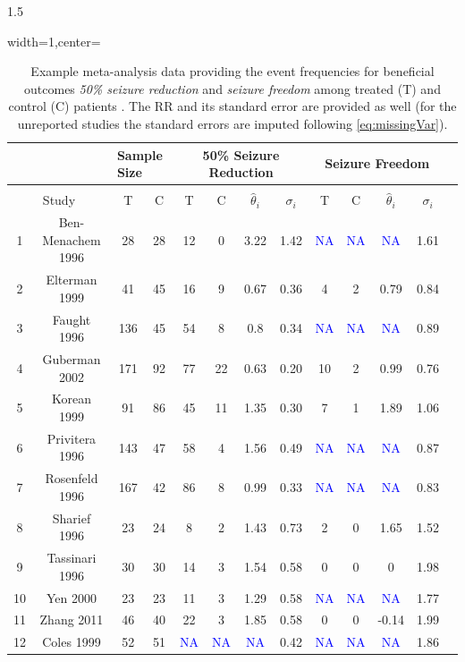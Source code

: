 \documentclass{article}
\begin{document}
\begin{spacing}{1.5}
\begin{table}[H]
\centering
\caption{Example meta-analysis data providing the event frequencies for beneficial outcomes \textit{50\% seizure reduction} and \textit{seizure freedom} among treated (T) and control (C) patients \cite{copas2019model, bresnahan2019topiramate}. The RR and its standard error are provided as well (for the unreported studies the standard errors are imputed following \eqref{eq:missingVar}).}
\label{tab:data}
\begin{adjustbox}{width=1\textwidth,center=\textwidth}
\begin{tabular}{ccccccccccccc}
\hline
\textbf{} &                   & \multicolumn{2}{l}{Sample Size} & \multicolumn{4}{c}{50\% Seizure Reduction}    & \multicolumn{4}{c}{Seizure Freedom}             \\ \hline \\[-0.4cm] 
\multicolumn{2}{c}{Study}     & T  & C   & T  & C  & $\hat\theta_i$  & $\sigma_i$ & T  & C   & $\hat\theta_i$   & $\sigma_i$ \\ \hline 
1  & Ben-Menachem 1996 & 28  & 28    & 12  & 0  & 3.22   & 1.42  & \textcolor{blue}{NA} & \textcolor{blue}{NA} & \textcolor{blue}{NA} & 1.61       \\2     & Elterman 1999   & 41   & 45  & 16  & 9  & 0.67  & 0.36    & 4   & 2  & 0.79  & 0.84       \\3  & Faught 1996 & 136 & 45  & 54   & 8   & 0.8    & 0.34 & \textcolor{blue}{NA} & \textcolor{blue}{NA} & \textcolor{blue}{NA} & 0.89 \\4  & Guberman 2002   & 171  & 92       & 77  & 22 & 0.63    & 0.20   & 10  & 2   & 0.99    & 0.76 \\5  & Korean 1999 & 91   & 86   & 45    & 11   & 1.35 & 0.30  & 7   & 1   & 1.89  & 1.06       \\6   & Privitera 1996    & 143 & 47  & 58    & 4  & 1.56  & 0.49   & \textcolor{blue}{NA} & \textcolor{blue}{NA} & \textcolor{blue}{NA}& 0.87       \\7  & Rosenfeld 1996 & 167 & 42 & 86  & 8  & 0.99   & 0.33  & \textcolor{blue}{NA} & \textcolor{blue}{NA} & \textcolor{blue}{NA} & 0.83 \\ 8   & Sharief 1996  & 23  & 24  & 8   & 2  & 1.43 & 0.73 & 2  & 0 & 1.65  & 1.52 \\9   & Tassinari 1996    & 30  & 30  & 14  & 3 & 1.54  & 0.58       & 0   & 0  & 0 & 1.98 \\10  & Yen 2000 & 23  & 23 & 11  & 3   & 1.29& 0.58  & \textcolor{blue}{NA} & \textcolor{blue}{NA} & \textcolor{blue}{NA} & 1.77 \\11 & Zhang 2011  & 46 & 40 & 22    & 3  & 1.85  & 0.58  & 0      & 0  & -0.14 & 1.99 \\12 & Coles 1999        & 52 & 51 & \textcolor{blue}{NA} & \textcolor{blue}{NA} & \textcolor{blue}{NA} & 0.42  & \textcolor{blue}{NA} & \textcolor{blue}{NA} & \textcolor{blue}{NA} & 1.86  \\ \hline 
\end{tabular}
\end{adjustbox}
\end{table}


\end{spacing}
\end{document}
